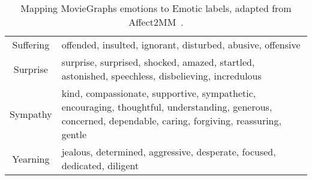 \begin{table}[t]
\begin{tabular}{cp{6.2cm}}
Suffering     & offended, insulted, ignorant, disturbed, abusive, offensive                                                                                                           \\
Surprise      & surprise, surprised, shocked, amazed, startled, astonished, speechless, disbelieving, incredulous                                                                     \\
Sympathy      & kind, compassionate, supportive, sympathetic, encouraging, thoughtful, understanding, generous, concerned, dependable, caring, forgiving, reassuring, gentle          \\
Yearning      & jealous, determined, aggressive, desperate, focused, dedicated, diligent                                                                                              \\ \bottomrule
\end{tabular}
\caption{Mapping MovieGraphs emotions to Emotic labels, adapted from Affect2MM~\cite{affect2mm}.}
\vspace{-4mm}
\label{tab:emotic_mapping}
\end{table}
